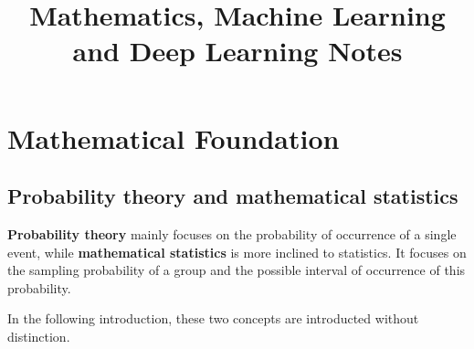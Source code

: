 \documentclass[10pt,onecolumn]{book}
\begin{document}
\date{}

\title{\textbf{Mathematics, Machine Learning and Deep Learning Notes}}
\maketitle

\thispagestyle{empty}
\newpage
{}
\newpage
\tableofcontents
\newpage
\listoftodos

\newpage
{}
\mainmatter

\chapter{Mathematical Foundation}
\section{Probability theory and mathematical statistics}
\textbf{Probability theory} mainly focuses on the probability of occurrence of a single event, while \textbf{mathematical statistics} is more inclined to statistics. It focuses on the sampling probability of a group and the possible interval of occurrence of this probability.

In the following introduction, these two concepts are introducted without distinction. 
\end{document}
